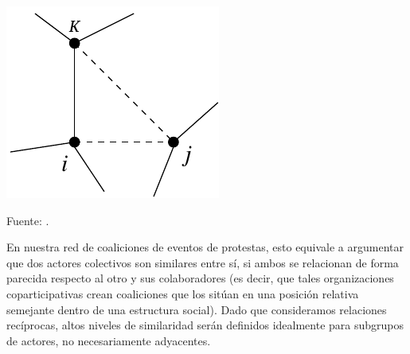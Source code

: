 \documentclass[letterpaper, 11pt]{book}
\theoremstyle{definition}
\theoremstyle{remark}
\begin{document}
\begin{minipage}{\linewidth}
\centering
{} \label{1.8_simKatz}
\includegraphics[scale=0.5]{img/1.8_simKatz.png}
\par\bigskip
\small Fuente: \citep[2]{2006_Newman_Similarity}.
\end{minipage}\bigskip


En nuestra red de coaliciones de eventos de protestas, esto equivale a argumentar que dos actores colectivos son similares entre sí, si ambos se relacionan de forma parecida respecto al otro y sus colaboradores (es decir, que tales organizaciones coparticipativas crean coaliciones que los sitúan en una posición relativa semejante dentro de una estructura social). 
Dado que consideramos relaciones recíprocas, altos niveles de similaridad serán definidos idealmente para subgrupos de actores, no necesariamente adyacentes. 
\end{document}

